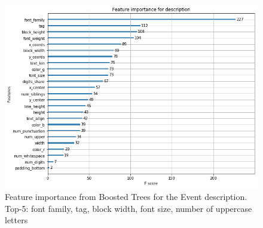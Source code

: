 \begin{figure}[h]
\begin{center}
\includegraphics[width=1.0\textwidth]{figures/importanceDescriptionboost}
\caption{Feature importance from Boosted Trees for the Event description. Top-5: font family, tag, block width, font size, number of uppercase letters}
\label{fig:importanceName}
\end{center}
\end{figure}

